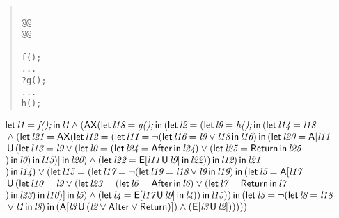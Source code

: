 \documentclass{article}
\newcommand{\U}{\,\mbox{\sf{U}}\,}
\newcommand{\A}{\mbox{\sf{A}}}
\newcommand{\E}{\mbox{\sf{E}}}
\newcommand{\AX}{\mbox{\sf{AX}}}
\newcommand{\mita}[1]{\mbox{\it{{#1}}}}
\newcommand{\msf}[1]{\mbox{\sf{{#1}}}}
\begin{document}
\begin{quote}\begin{verbatim}

@@
@@

f();
...
?g();
...
h();
\end{verbatim}\end{quote}

\[\begin{array}{l}
\mita{\sf{let}} \, \mita{l1} = \mita{f();} \, \mita{\sf{in}} \, \mita{l1} \wedge (\AX(\mita{\sf{let}} \, \mita{l18} = \mita{g();} \, \mita{\sf{in}} \, (\mita{\sf{let}} \, \mita{l2} = (\mita{\sf{let}} \, \mita{l9} = \mita{h();} \, \mita{\sf{in}} \, (\mita{\sf{let}} \, \mita{l14} = \mita{l18}\\\mbox{} \wedge (\mita{\sf{let}} \, \mita{l21} = \AX(\mita{\sf{let}} \, \mita{l12} = (\mita{\sf{let}} \, \mita{l11} = \neg (\mita{\sf{let}} \, \mita{l16} = \mita{l9} \vee \mita{l18} \, \mita{\sf{in}} \, \mita{l16}
) \, \mita{\sf{in}} \, (\mita{\sf{let}} \, \mita{l20} = \A[\mita{l11}\\\mbox{} \U (\mita{\sf{let}} \, \mita{l13} = \mita{l9} \vee (\mita{\sf{let}} \, \mita{l0} = (\mita{\sf{let}} \, \mita{l24} = \msf{After} \, \mita{\sf{in}} \, \mita{l24}
) \vee (\mita{\sf{let}} \, \mita{l25} = \msf{Return} \, \mita{\sf{in}} \, \mita{l25}\\\mbox{}
) \, \mita{\sf{in}} \, \mita{l0}
) \, \mita{\sf{in}} \, \mita{l13}
)]
 \, \mita{\sf{in}} \, \mita{l20}
) \wedge (\mita{\sf{let}} \, \mita{l22} = \E[\mita{l11} \U \mita{l9}]
 \, \mita{\sf{in}} \, \mita{l22}
)
) \, \mita{\sf{in}} \, \mita{l12}
) \, \mita{\sf{in}} \, \mita{l21}\\\mbox{}
) \, \mita{\sf{in}} \, \mita{l14}
) \vee (\mita{\sf{let}} \, \mita{l15} = (\mita{\sf{let}} \, \mita{l17} = \neg (\mita{\sf{let}} \, \mita{l19} = \mita{l18} \vee \mita{l9} \, \mita{\sf{in}} \, \mita{l19}
) \, \mita{\sf{in}} \, (\mita{\sf{let}} \, \mita{l5} = \A[\mita{l17}\\\mbox{} \U (\mita{\sf{let}} \, \mita{l10} = \mita{l9} \vee (\mita{\sf{let}} \, \mita{l23} = (\mita{\sf{let}} \, \mita{l6} = \msf{After} \, \mita{\sf{in}} \, \mita{l6}
) \vee (\mita{\sf{let}} \, \mita{l7} = \msf{Return} \, \mita{\sf{in}} \, \mita{l7}\\\mbox{}
) \, \mita{\sf{in}} \, \mita{l23}
) \, \mita{\sf{in}} \, \mita{l10}
)]
 \, \mita{\sf{in}} \, \mita{l5}
) \wedge (\mita{\sf{let}} \, \mita{l4} = \E[\mita{l17} \U \mita{l9}]
 \, \mita{\sf{in}} \, \mita{l4}
)
) \, \mita{\sf{in}} \, \mita{l15}
)
) \, \mita{\sf{in}} \, (\mita{\sf{let}} \, \mita{l3} = \neg (\mita{\sf{let}} \, \mita{l8} = \mita{l18}\\\mbox{} \vee \mita{l1} \, \mita{\sf{in}} \, \mita{l8}
) \, \mita{\sf{in}} \, (\A[\mita{l3} \U (\mita{l2} \vee \msf{After} \vee \msf{Return})]
) \wedge (\E[\mita{l3} \U \mita{l2}]
)
)
)
))

\end{array}\]
\end{document}
